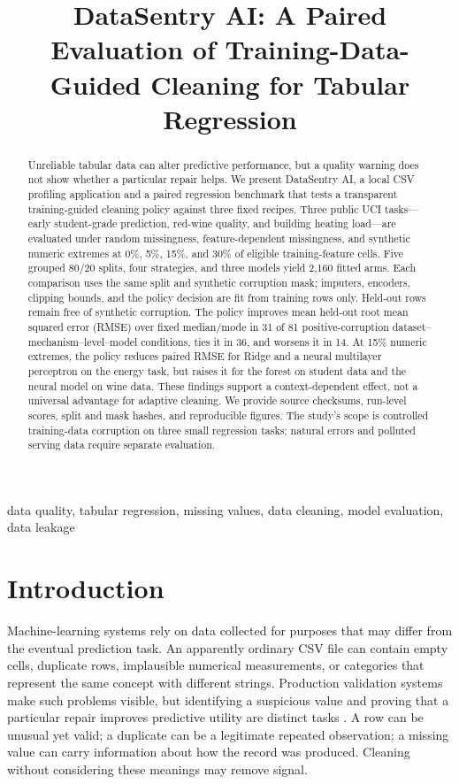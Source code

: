 \documentclass[conference]{IEEEtran}
\title{DataSentry AI: A Paired Evaluation of Training-Data-Guided Cleaning for Tabular Regression}
\author{\IEEEauthorblockN{Tilaksinh Chauhan (23000740), Kavya Jariwala (23000543),\\ Bhargav Panchal (23000502), Om Nathani (23000883)}
\IEEEauthorblockA{School of Engineering and Technology\\ Navrachana University\\ India}}
\begin{document}
\maketitle
\begin{abstract}
Unreliable tabular data can alter predictive performance, but a quality warning does not show whether a particular repair helps. We present DataSentry AI, a local CSV profiling application and a paired regression benchmark that tests a transparent training-guided cleaning policy against three fixed recipes. Three public UCI tasks---early student-grade prediction, red-wine quality, and building heating load---are evaluated under random missingness, feature-dependent missingness, and synthetic numeric extremes at 0\%, 5\%, 15\%, and 30\% of eligible training-feature cells. Five grouped 80/20 splits, four strategies, and three models yield 2,160 fitted arms. Each comparison uses the same split and synthetic corruption mask; imputers, encoders, clipping bounds, and the policy decision are fit from training rows only. Held-out rows remain free of synthetic corruption. The policy improves mean held-out root mean squared error (RMSE) over fixed median/mode in 31 of 81 positive-corruption dataset--mechanism--level--model conditions, ties it in 36, and worsens it in 14. At 15\% numeric extremes, the policy reduces paired RMSE for Ridge and a neural multilayer perceptron on the energy task, but raises it for the forest on student data and the neural model on wine data. These findings support a context-dependent effect, not a universal advantage for adaptive cleaning. We provide source checksums, run-level scores, split and mask hashes, and reproducible figures. The study's scope is controlled training-data corruption on three small regression tasks; natural errors and polluted serving data require separate evaluation.
\end{abstract}
\begin{IEEEkeywords}data quality, tabular regression, missing values, data cleaning, model evaluation, data leakage\end{IEEEkeywords}

\section{Introduction}
Machine-learning systems rely on data collected for purposes that may differ from the eventual prediction task. An apparently ordinary CSV file can contain empty cells, duplicate rows, implausible numerical measurements, or categories that represent the same concept with different strings. Production validation systems make such problems visible, but identifying a suspicious value and proving that a particular repair improves predictive utility are distinct tasks \cite{Breck2019,Mahdavi2019}. A row can be unusual yet valid; a duplicate can be a legitimate repeated observation; a missing value can carry information about how the record was produced. Cleaning without considering these meanings may remove signal.
\end{document}
